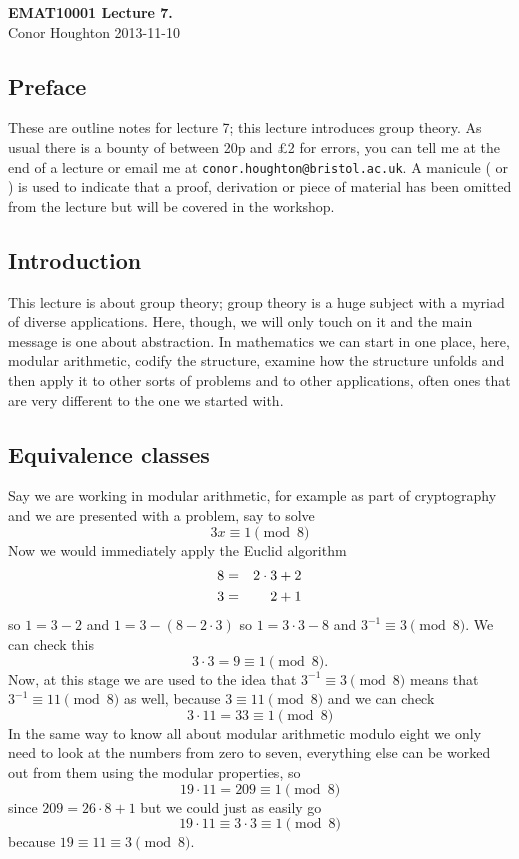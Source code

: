 \documentclass[12pt]{article}
\begin{document}
\begin{center}
{\bf EMAT10001 Lecture 7.}\\[1cm]{} Conor Houghton 2013-11-10
\end{center}
\subsection*{Preface} 
These are outline notes for lecture 7; this lecture introduces group
theory. As usual there is a bounty of between 20p and \pounds 2 for
errors, you can tell me at the end of a lecture or email me at
\texttt{conor.houghton{@}bristol.ac.uk}. A manicule (\HandLeft{} or
\HandRight) is used to indicate that a proof, derivation or piece of
material has been omitted from the lecture but will be covered in the
workshop.

\subsection*{Introduction}

This lecture is about group theory; group theory is a huge subject
with a myriad of diverse applications. Here, though, we will only
touch on it and the main message is one about abstraction. In
mathematics we can start in one place, here, modular arithmetic,
codify the structure, examine how the structure unfolds and then apply
it to other sorts of problems and to other applications, often ones
that are very different to the one we started with.

\subsection*{Equivalence classes}
Say we are working in modular arithmetic, for example as part of
cryptography and we are presented with a problem, say to solve
\begin{equation}
3x\equiv 1 \pmod{8}
\end{equation}
Now we would immediately apply the Euclid algorithm
\begin{eqnarray}
8&=&2\cdot 3+2\cr
3&=&2+1
\end{eqnarray}
so $1=3-2$ and $1=3-(8-2\cdot 3)$ so $1=3\cdot 3-8$ and $3^{-1}\equiv 3\pmod{8}$. We can check this
\begin{equation}
3\cdot 3=9\equiv 1\pmod{8}.
\end{equation}
Now, at this stage we are used to the idea that $3^{-1}\equiv
3\pmod{8}$ means that $3^{-1}\equiv 11 \pmod{8}$ as well, because
$3\equiv 11\pmod{8}$ and we can check
\begin{equation}
3\cdot 11=33\equiv 1\pmod{8}
\end{equation}
In the same way to know all about modular arithmetic modulo eight we only need to look at the numbers from zero to seven, everything else can be worked out from them using the modular properties, so
\begin{equation}
19\cdot 11=209\equiv 1\pmod{8}
\end{equation}
since $209=26\cdot 8+1$ but we could just as easily go
\begin{equation}
19\cdot 11\equiv 3\cdot 3\equiv 1\pmod{8}
\end{equation}
because $19\equiv 11\equiv 3\pmod{8}$.
\end{document}
